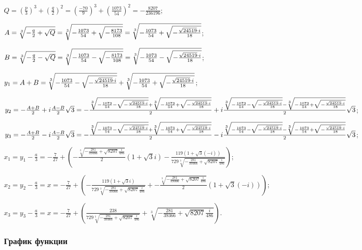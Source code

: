 \documentclass[14pt]{extreport}
\begin{document}
$Q = (\frac{p}{3})^3 +(\frac{q}{2})^2 = (\frac{-70}{9})^3 + (\frac{1073}{54})^2 = -\frac{8207}{236196}$;

$A = \sqrt[3]{-{{q}\over{2}}+\sqrt{Q}} = \sqrt[3]{-{{1073}\over{54}}+\sqrt{-\frac{8173}{108}}} =
\sqrt[3]{-{{1073}\over{54}}+\sqrt{-\frac{\sqrt{24519}\cdot i}{18}}}$;

$B = \sqrt[3]{-{{q}\over{2}}-\sqrt{Q}} = \sqrt[3]{-{{1073}\over{54}}-\sqrt{-\frac{8173}{108}}} =
\sqrt[3]{-{{1073}\over{54}}-\sqrt{-\frac{\sqrt{24519}\cdot i}{18}}}$;

$y_1 = A + B = \sqrt[3]{-{{1073}\over{54}}-\sqrt{-\frac{\sqrt{24519}\cdot i}{18}}} +
\sqrt[3]{-{{1073}\over{54}}+\sqrt{-\frac{\sqrt{24519}\cdot i}{18}}}$;

$y_2 = -\frac{A + B}{2} + i\frac{A - B}{2}\sqrt{3} =
-\frac{\sqrt[3]{-{{1073}\over{54}}-\sqrt{-\frac{\sqrt{24519}\cdot i}{18}}} +
\sqrt[3]{-{{1073}\over{54}}+\sqrt{-\frac{\sqrt{24519}\cdot i}{18}}}}{2} +\\
i\frac{\sqrt[3]{-{{1073}\over{54}}-\sqrt{-\frac{\sqrt{24519}\cdot i}{18}}} -
\sqrt[3]{-{{1073}\over{54}}+\sqrt{-\frac{\sqrt{24519}\cdot i}{18}}}}{2}\sqrt{3}$;

$y_3 = -\frac{A + B}{2} - i\frac{A - B}{2}\sqrt{3} =
-\frac{\sqrt[3]{-{{1073}\over{54}}-\sqrt{-\frac{\sqrt{24519}\cdot i}{18}}} +
\sqrt[3]{-{{1073}\over{54}}+\sqrt{-\frac{\sqrt{24519}\cdot i}{18}}}}{2} -\\
i\frac{\sqrt[3]{-{{1073}\over{54}}-\sqrt{-\frac{\sqrt{24519}\cdot i}{18}}} -
\sqrt[3]{-{{1073}\over{54}}+\sqrt{-\frac{\sqrt{24519}\cdot i}{18}}}}{2}\sqrt{3}$;

$x_1 = y_1 - \frac{a}{3} = - \frac{7}{27} + \left(- \frac{\sqrt[3]{- \frac{281}{39366} + \sqrt{8207}
\frac{i}{486}}}{2} \left(1 + \sqrt{3} i\right) - \frac{119 \left(1 + \sqrt{3} \left(- i\right)\right)}{729
\sqrt[3]{- \frac{281}{39366} + \sqrt{8207} \frac{i}{486}}}\right)$;

$x_2 = y_2 - \frac{a}{3} = x = - \frac{7}{27} + \left(- \frac{119 \left(1 + \sqrt{3} i\right)}{729
\sqrt[3]{- \frac{281}{39366} + \sqrt{8207} \frac{i}{486}}} + - \frac{\sqrt[3]{- \frac{281}{39366} +
\sqrt{8207} \frac{i}{486}}}{2} \left(1 + \sqrt{3} \left(- i\right)\right)\right)$;

$x_3 = y_3 - \frac{a}{3} = x = - \frac{7}{27} + \left(\frac{238}{729 \sqrt[3]{- \frac{281}{39366} +
\sqrt{8207} \frac{i}{486}}} + \sqrt[3]{- \frac{281}{39366} + \sqrt{8207} \frac{i}{486}}\right)$.


\subsubsection{График функции}
\end{document}

